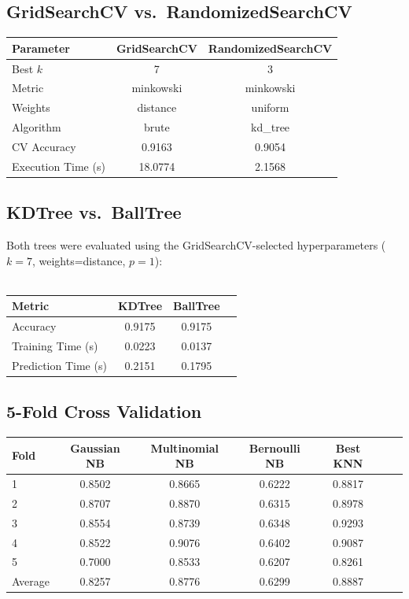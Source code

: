 \documentclass[12pt,a4paper]{article}
\begin{document}
\subsection{GridSearchCV vs.\ RandomizedSearchCV}
\begin{tabular}{lcc}
\toprule
Parameter & GridSearchCV & RandomizedSearchCV\\
\midrule
Best $k$ & 7 & 3 \\
Metric & minkowski & minkowski \\
Weights & distance & uniform \\
Algorithm & brute & kd\_tree \\
CV Accuracy & 0.9163 & 0.9054 \\
Execution Time (s) & 18.0774 & 2.1568 \\
\bottomrule
\end{tabular}

\subsection{KDTree vs.\ BallTree}
Both trees were evaluated using the GridSearchCV-selected hyperparameters ($k=7$, weights=distance, $p=1$): \\ \\
\begin{tabular}{lccc}
\toprule
Metric & KDTree & BallTree\\
\midrule
Accuracy & 0.9175 & 0.9175 \\
Training Time (s) & 0.0223 & 0.0137 \\
Prediction Time (s) & 0.2151 & 0.1795 \\
\bottomrule
\end{tabular}

\subsection{5-Fold Cross Validation}
\begin{tabular}{lcccccc}
\toprule
Fold & Gaussian NB & Multinomial NB & Bernoulli NB & Best KNN\\
\midrule
1 & 0.8502 & 0.8665 & 0.6222 & 0.8817 \\
2 & 0.8707 & 0.8870 & 0.6315 & 0.8978 \\
3 & 0.8554 & 0.8739 & 0.6348 & 0.9293 \\
4 & 0.8522 & 0.9076 & 0.6402 & 0.9087 \\
5 & 0.7000 & 0.8533 & 0.6207 & 0.8261 \\
\midrule
Average & 0.8257 & 0.8776 & 0.6299 & 0.8887 \\
\bottomrule
\end{tabular}
\end{document}
